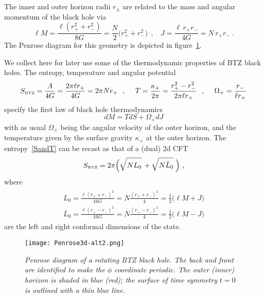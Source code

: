 \documentclass[11pt]{article}
\def\tight#1{\! #1 \!}  %
\def\[{\left[}
\def\btz{{\sst \rm BTZ}}
\def\half{\frac12}
\def\be{\begin{equation}}
\def\ee{\end{equation}}
\numberwithin{equation}{section}
\def\sst{\scriptscriptstyle}
\def\half{\frac12}
\begin{document}
The inner and outer horizon radii $r_\pm$ are related to the mass and angular momentum of the black hole via
\be
\label{MJrpm}
\ell M = \frac{\ell (r_+^2+r_-^2)}{8G} = \frac N2 \big( {r_+^2 + r_-^2} \big)
~~,~~~~
J = \frac{\ell \, r_+ r_-  }{4G} = N\, r_+ r_- ~.
\ee 
The Penrose diagram for this geometry is depicted in figure~\ref{fig:Penrose3d}.

We collect here for later use some of the thermodynamic properties of BTZ black holes.  The entropy, temperature and angular potential
\be
\label{SandT}
S_\btz = \frac{A}{4G} = \frac{2\pi\ell r_+}{4G} = 2\pi N r_+
~~,~~~~
T = \frac{\kappa_+}{2\pi} = \frac{r_+^2 - r_-^2}{2\pi \ell r_+}  
~~,~~~~
\Omega_+ = \frac{r_-}{\ell r_+} 
\ee
specify the first law of black hole thermodynamics
\be
\label{firstlaw}
dM = T dS + \Omega_+ dJ
\ee
with as usual $\Omega_+$ being the angular velocity of the outer horizon, and the temperature given by the surface gravity $\kappa_+$ at the outer horizon.  The entropy~\eqref{SandT} can be recast as that of a (dual) 2d CFT
\begin{align}
\label{Scft}
S_\btz = 2\pi\Big(\sqrt{\vphantom{\bar L_0} NL_0} \,+ \sqrt{N\bar L_0} \; \Big) ~,
\end{align}
where
\begin{align}
\begin{split}
\label{Lzero}
L_0 = \frac{\ell (r_+ \tight+ r_-)^2}{16G} = N\frac{(r_+ \tight+ r_-)^2}{4} = \half\big( \ell M+J \big)
\\[.2cm]
\bar L_0 = \frac{\ell (r_+ - r_-)^2}{16G} = N\frac{(r_+ - r_-)^2}{4} = \half\big( \ell M-J \big)
\end{split}
\end{align}
are the left and right conformal dimensions of the state.


%
\begin{figure}[ht]
%
\centering
\texttt{[image: Penrose3d-alt2.png]}
\caption{\it Penrose diagram of a rotating BTZ black hole.  The back and front are identified to make the $\phi$ coordinate periodic.  The outer (inner) horizon is shaded in blue (red); the surface of time symmetry $t=0$ is outlined with a thin blue line.}
\label{fig:Penrose3d}
\end{figure}
%
\end{document}
